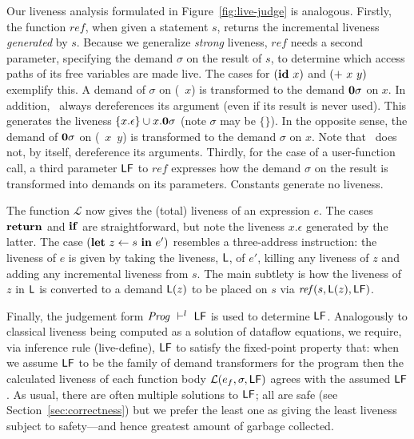 Our liveness analysis formulated in Figure~\ref{fig:live-judge}
is analogous.
Firstly, the function $\mathit{ref}$, when given a statement $s$,
returns the incremental liveness {\em generated} by $s$.
Because we generalize {\em strong} liveness, $\mathit{ref}$ needs a second parameter,
specifying the demand $\sigma$ on the result of $s$,
to determine which access paths of its free variables are made live.
The cases for $(\mbox{$\mathbf{ id}$}\ x)$ and $(\mbox{$\mathbf{ +}$}\ x\ y)$ exemplify this.
A demand  of  $\sigma$  on  (\CAR~$x$)  is  transformed  to  the  demand
$\mathbf{0}\sigma$  on  $x$.   In  addition, \CAR\  always  dereferences  its
argument (even if its result is never used).
This generates the liveness  $\{x.\epsilon\} \cup  x.\mathbf{0}\sigma$
(note $\sigma$ may be $\{\}$).
In the opposite  sense, the  demand  of $\mathbf{0}\sigma$  on
(\CONS~$x$~$y$) is  transformed to the  demand $\sigma$ on  $x$.  Note
that \CONS\ does not, by itself, dereference its arguments.
Thirdly, for the case of a user-function call, a third parameter $\mathsf{LF}$ to 
$\mathit{ref}$
expresses how the demand $\sigma$ on the result is transformed into demands on its parameters.
Constants generate no liveness.

The  function  $\mathcal{L}$ now  gives  the  (total)  liveness of  an
expression $e$.   The cases $\mbox{$\mathbf{ return}$}$ and  $\mbox{$\mathbf{ if}$}$ are straightforward,
but note the liveness $x.\epsilon$  generated by the latter.  The case
$(\mbox{$\mathbf{ let}$}\   z\leftarrow   s\  \mbox{$\mathbf{ in}$}\   e')$   resembles  a   three-address
instruction:  the liveness  of $e$  is given  by taking  the liveness,
$\mathsf{L}$, of $e'$, killing any liveness of $z$ and adding any incremental
liveness from  $s$.  The main subtlety  is how the liveness  of $z$ in
$\mathsf{L}$  is converted  to a  demand  $\mathsf{L}(z)$ to  be placed  on $s$  via
$\mathit{ref}(s,\mathsf{L}(z),\mathsf{LF})$.

Finally, the  judgement form $\mathit{Prog}  \ \vdash^l\  \mathsf{LF}$ is  used to
determine  $\mathsf{LF}$\@.   Analogously   to  classical  liveness  being
computed  as  a  solution  of  dataflow  equations,  we  require,  via
inference   rule  ({\sc  live-define}),   $\mathsf{LF}$  to   satisfy  the
fixed-point property that:  when we assume $\mathsf{LF}$ to  be the family
of demand transformers for the program then the calculated liveness of
each function  body $\mathcal{L}(e_f,\sigma,\mathsf{LF})$ agrees  with the
assumed $\mathsf{LF}$.   As usual, there  are often multiple  solutions to
$\mathsf{LF}$;  all are  safe (see  Section~\ref{sec:correctness})  but we
prefer  the  least  one  as  giving  the  least  liveness  subject  to
safety---and hence greatest amount of garbage collected.

